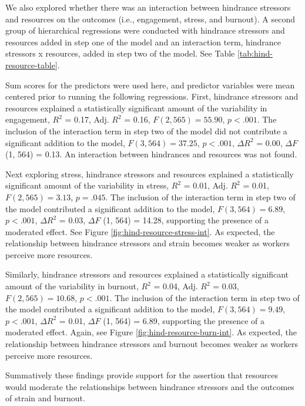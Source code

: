 \documentclass[
  man,mask]{apa7}
\begin{document}
We also explored whether there was an interaction between hindrance stressors and resources on the outcomes (i.e., engagement, stress, and burnout). A second group of hierarchical regressions were conducted with hindrance stressors and resources added in step one of the model and an interaction term, hindrance stressors x resources, added in step two of the model. See Table \ref{tab:hind-resource-table}.

Sum scores for the predictors were used here, and predictor variables were mean centered prior to running the following regressions. First, hindrance stressors and resources explained a statistically significant amount of the variability in engagement, \(R^2\) = 0.17, Adj. \(R^2\) = 0.16, \(F(2, 565) = 55.90\), \(p < .001\). The inclusion of the interaction term in step two of the model did not contribute a significant addition to the model, \(F(3, 564) = 37.25\), \(p < .001\), \(\Delta R^2\) = 0.00, \(\Delta F\) (1, 564) = 0.13. An interaction between hindrances and resources was not found.

Next exploring stress, hindrance stressors and resources explained a statistically significant amount of the variability in stress, \(R^2\) = 0.01, Adj. \(R^2\) = 0.01, \(F(2, 565) = 3.13\), \(p = .045\). The inclusion of the interaction term in step two of the model contributed a significant addition to the model, \(F(3, 564) = 6.89\), \(p < .001\), \(\Delta R^2\) = 0.03, \(\Delta F\) (1, 564) = 14.28, supporting the presence of a moderated effect. See Figure \ref{fig:hind-resource-stress-int}. As expected, the relationship between hindrance stressors and strain becomes weaker as workers perceive more resources.

Similarly, hindrance stressors and resources explained a statistically significant amount of the variability in burnout, \(R^2\) = 0.04, Adj. \(R^2\) = 0.03, \(F(2, 565) = 10.68\), \(p < .001\). The inclusion of the interaction term in step two of the model contributed a significant addition to the model, \(F(3, 564) = 9.49\), \(p < .001\), \(\Delta R^2\) = 0.01, \(\Delta F\) (1, 564) = 6.89, supporting the presence of a moderated effect. Again, see Figure \ref{fig:hind-resource-burn-int}. As expected, the relationship between hindrance stressors and burnout becomes weaker as workers perceive more resources.

Summatively these findings provide support for the assertion that resources would moderate the relationships between hindrance stressors and the outcomes of strain and burnout.
\end{document}
